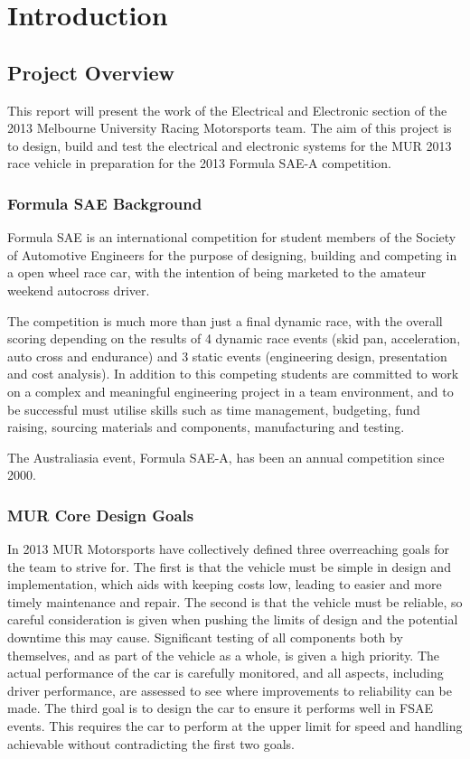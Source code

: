 \chapter{Introduction}

\section{Project Overview}
This report will present the work of the Electrical and Electronic section of the 2013 Melbourne University Racing Motorsports team.  The aim of this project is to design, build and test the electrical and electronic systems for the MUR 2013 race vehicle in preparation for the 2013 Formula SAE-A competition.

\subsection{Formula SAE Background}
Formula SAE is an international competition for student members of the Society of Automotive Engineers for the purpose of designing, building and competing in a open wheel race car, with the intention of being marketed to the amateur weekend autocross driver.

The competition is much more than just a final dynamic race, with the overall scoring depending on the results of 4 dynamic race events (skid pan, acceleration, auto cross and endurance) and 3 static events (engineering design, presentation and cost analysis).  In addition to this competing students are committed to work on a complex and meaningful engineering project in a team environment, and to be successful must utilise skills such as time management, budgeting, fund raising, sourcing materials and components, manufacturing and testing.

The Australiasia event, Formula SAE-A, has been an annual competition since 2000.

\subsection{MUR Core Design Goals}
In 2013 MUR Motorsports have collectively defined three overreaching goals for the team to strive for. The first is that the vehicle must be simple in design and implementation, which aids with keeping costs low, leading to easier and more timely maintenance and repair. The second is that the vehicle must be reliable, so careful consideration is given when pushing the limits of design and the potential downtime this may cause. Significant testing of all components both by themselves, and as part of the vehicle as a whole, is given a high priority. The actual performance of the car is carefully monitored, and all aspects, including driver performance, are assessed to see where improvements to reliability can be made. The third goal is to design the car to ensure it performs well in FSAE events. This requires the car to perform at the upper limit for speed and handling achievable without contradicting the first two goals.

